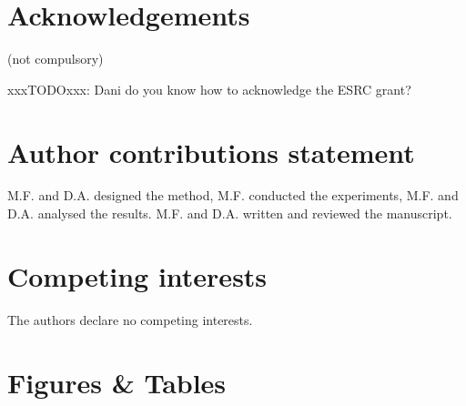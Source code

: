 \documentclass[fleqn,10pt]{wlscirep}
\begin{document}



\section*{Acknowledgements} (not compulsory)


xxxTODOxxx: Dani do you know how to acknowledge the ESRC grant?

\section*{Author contributions statement}


M.F. and D.A. designed the method, M.F. conducted the experiments, M.F. and D.A.
analysed the results. M.F. and D.A. written and reviewed the manuscript.

\section*{Competing interests}

The authors declare no competing interests.

\section*{Figures \& Tables}
\end{document}
